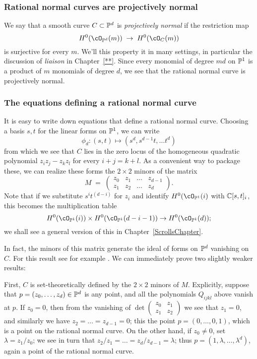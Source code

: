\subsubsection{Rational normal curves are projectively normal}


We say that a smooth curve $C \subset \PP^d$ is \emph{projectively normal} if the restriction map
$$
H^0(\cO_{\PP^d}(m)) \; \to \; H^0(\cO_{C}(m)) 
$$
is surjective for every $m$. We'll this property it in many settings, in particular the discussion of \emph{liaison} in Chapter~\ref{**}.
Since every monomial of degree $md$ on $\PP^1$ is a product of $m$ monomials of degree $d$, we see that the rational normal curve is projectively normal. 


\subsubsection{The equations defining a rational normal curve}
It is easy to write down equations that define a rational normal curve. Choosing a basis $s,t$ for the linear forms on $\PP^1$, we can write
$$
\phi_d : (s,t) \mapsto (s^d, s^{d-1}t,\dots t^d)
$$
from which we see that $C$ lies in the zero locus of the homogeneous quadratic polynomial $z_iz_j - z_kz_l$ for every $i+j=k+l$. As a convenient way to package these, we can realize these forms the $2\times 2$ minors of the matrix
$$
M \; = \; \begin{pmatrix}
z_0 & z_1 & \dots & z_{d-1} \\
z_1 & z_2 & \dots & z_d
\end{pmatrix}.
$$
Note that if we substitute $s^it^{(d-i)}$ for $z_i$ and identify $H^0(\cO_{\PP^1}(i)$ with $\CC[s,t]_i$, this becomes the multiplication table
$$
H^0(\cO_{\PP^1}(i)) \times H^0(\cO_{\PP^1}(d-i-1)) \to H^0(\cO_{\PP^1}(d));
$$
we shall see a general version of this in Chapter~\ref{ScrollsChapter}. 

In fact, the minors of this matrix generate the ideal of forms on $\PP^d$ vanishing on $C$. For this result see for example \cite[****]{E}. 
We can immediately prove two slightly weaker results:

First, $C$ is set-theoretically defined by the $2\times 2$ minors of $M$. Explicitly, suppose that $p = (z_0,\dots,z_d) \in \PP^d$ is any point, and all the polynomials $Q_{ijkl}$ above vanish at $p$. If $z_0 = 0$, then from the vanishing of 
$\det \begin{pmatrix}
z_0 & z_1  \\
z_1 & z_2 
\end{pmatrix}$ 
we see that $z_1 = 0$, and similarly we have $z_2 = \dots = z_{d-1}=0$; this the point $p = (0,\dots,0,1)$, which is a point on the rational normal curve. On the other hand, if $z_0 \neq 0$, set $\lambda = z_1/z_0$; we see in turn that $z_2/z_1 = \dots = z_d/z_{d-1} = \lambda$; thus $p = (1, \lambda, \dots,\lambda^d)$, again a point of the rational normal curve.

